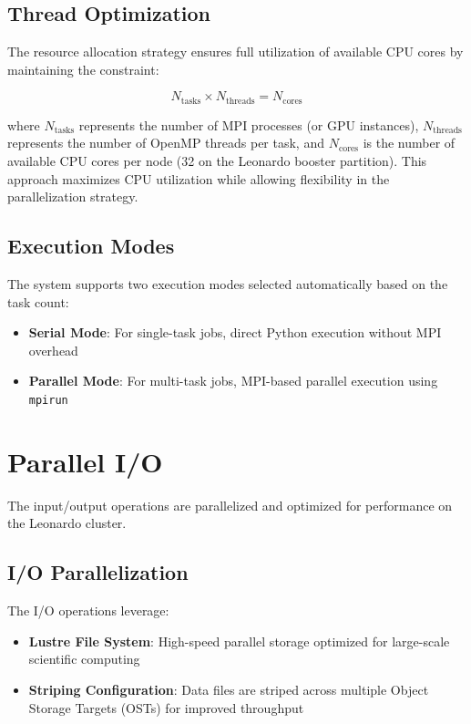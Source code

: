 \subsection{Thread Optimization}
The resource allocation strategy ensures full utilization of available CPU
cores by maintaining the constraint:

\begin{equation}
  N_{\text{tasks}} \times N_{\text{threads}} = N_{\text{cores}}
\end{equation}

where $N_{\text{tasks}}$ represents the number of MPI processes (or GPU
instances), $N_{\text{threads}}$ represents the number of OpenMP threads per
task, and $N_{\text{cores}}$ is the number of available CPU cores per node (32
on the Leonardo booster partition). This approach maximizes CPU utilization
while allowing flexibility in the parallelization strategy.

\subsection{Execution Modes}
The system supports two execution modes selected automatically based on the
task count:

\begin{itemize}
  \item \textbf{Serial Mode}: For single-task jobs, direct Python execution
    without MPI overhead

  \item \textbf{Parallel Mode}: For multi-task jobs, MPI-based parallel
    execution using \texttt{mpirun}
\end{itemize}

\section{Parallel I/O}

The input/output operations are parallelized and optimized for performance on
the Leonardo cluster.

\subsection{I/O Parallelization}
The I/O operations leverage:

\begin{itemize}
  \item \textbf{Lustre File System}: High-speed parallel storage optimized for
    large-scale scientific computing

  \item \textbf{Striping Configuration}: Data files are striped across multiple
    Object Storage Targets (OSTs) for improved throughput
\end{itemize}

